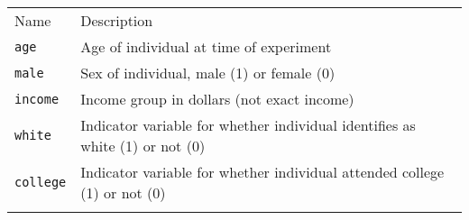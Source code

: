 \documentclass[]{article}
\begin{document}
\begin{longtable}[c]{@{}ll@{}}
\toprule\addlinespace
\begin{minipage}[b]{0.25\columnwidth}\raggedright
Name
\end{minipage} & \begin{minipage}[b]{0.68\columnwidth}\raggedright
Description
\end{minipage}
\\\addlinespace
\midrule\endhead
\begin{minipage}[t]{0.25\columnwidth}\raggedright
\texttt{age}
\end{minipage} & \begin{minipage}[t]{0.68\columnwidth}\raggedright
Age of individual at time of experiment
\end{minipage}
\\\addlinespace
\begin{minipage}[t]{0.25\columnwidth}\raggedright
\texttt{male}
\end{minipage} & \begin{minipage}[t]{0.68\columnwidth}\raggedright
Sex of individual, male (1) or female (0)
\end{minipage}
\\\addlinespace
\begin{minipage}[t]{0.25\columnwidth}\raggedright
\texttt{income}
\end{minipage} & \begin{minipage}[t]{0.68\columnwidth}\raggedright
Income group in dollars (not exact income)
\end{minipage}
\\\addlinespace
\begin{minipage}[t]{0.25\columnwidth}\raggedright
\texttt{white}
\end{minipage} & \begin{minipage}[t]{0.68\columnwidth}\raggedright
Indicator variable for whether individual identifies as white (1) or not
(0)
\end{minipage}
\\\addlinespace
\begin{minipage}[t]{0.25\columnwidth}\raggedright
\texttt{college}
\end{minipage} & \begin{minipage}[t]{0.68\columnwidth}\raggedright
Indicator variable for whether individual attended college (1) or not
(0)
\end{minipage}
\\\addlinespace
\begin{minipage}[t]{0.25\columnwidth}\raggedright

\end{minipage}
\end{longtable}
\end{document}
